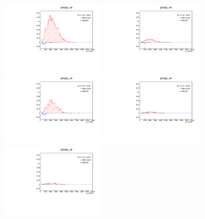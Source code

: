\begin{figure}[ht]
    \centering
        \includegraphics[width=0.45\textwidth]{figures/aQGC/FM0_0ptag1pfat0pjet_0ptv_SRVBS_HP_MllJ.pdf}
        \includegraphics[width=0.45\textwidth]{figures/aQGC/FM1_0ptag1pfat0pjet_0ptv_SRVBS_HP_MllJ.pdf}
        \includegraphics[width=0.45\textwidth]{figures/aQGC/FM2_0ptag1pfat0pjet_0ptv_SRVBS_HP_MllJ.pdf}
        \includegraphics[width=0.45\textwidth]{figures/aQGC/FM3_0ptag1pfat0pjet_0ptv_SRVBS_HP_MllJ.pdf}
        \includegraphics[width=0.45\textwidth]{figures/aQGC/FM3_0ptag1pfat0pjet_0ptv_SRVBS_HP_MllJ.pdf}

\end{figure}
